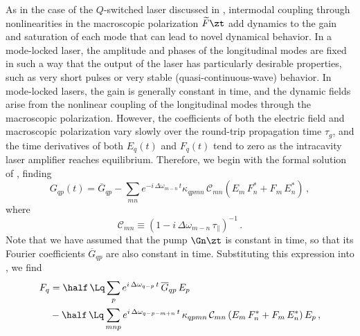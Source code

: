 As in the case of the $Q$-switched laser discussed in , intermodal coupling through nonlinearities in the macroscopic polarization $\widetilde{F}\zt$ add dynamics to the gain and saturation of each mode that can lead to novel dynamical behavior. In a mode-locked laser, the amplitude and phases of the longitudinal modes are fixed in such a way that the output of the laser has particularly desirable properties, such as very short pulses or very stable (quasi-continuous-wave) behavior. 
In mode-locked lasers, the gain is generally constant in time, and the dynamic fields arise from the nonlinear coupling of the longitudinal modes through the macroscopic polarization. However, the coefficients of both the electric field and macroscopic polarization vary slowly over the round-trip propagation time $\tau_g$, and the time derivatives of both $E_q(t)$ and $F_q(t)$ tend to zero as the intracavity laser amplifier reaches equilibrium. Therefore, we begin with the formal solution of , finding
\begin{equation}
  G_{q p}(t) = \overline{G}_{q p} - \sum_{m n} e^{-i\, \Delta \omega_{m - n}\, t} \kappa_{q p m n}\, \mathcal{C}_{m n} \left( E_m\, F_n^\ast + F_m\, E_n^\ast \right)\, ,
\end{equation}
where
\begin{equation}
  \mathcal{C}_{m n} \equiv \left(1 - i\, \Delta \omega_{m - n}\, \tau_\parallel\right)^{-1}\, .
\end{equation}
Note that we have assumed that the pump $\Gn\zt$ is constant in time, so that its Fourier coefficients $\overline{G}_{q p}$ are also constant in time. Substituting this expression into , we find
\begin{equation}
    \label{eqn:mml_fqt_mll}
    \begin{split}
        F_q &= \half\, \Lq \sum_p e^{i\, \Delta \omega_{q - p}\, t}\, \overline{G}_{q p}\, E_p \\
        &- \half\, \Lq \sum_{m n p} e^{i\, \Delta \omega_{q - p - m + n}\, t}\, \kappa_{q p m n}\, \mathcal{C}_{m n} \left( E_m\, F_n^\ast + F_m\, E_n^\ast \right) E_p\, ,
    \end{split}
\end{equation}
